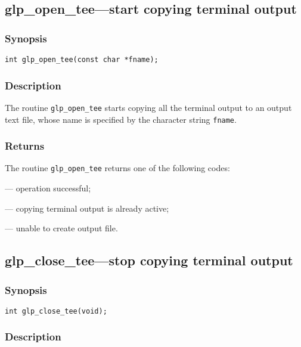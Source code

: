\subsection{glp\_open\_tee---start copying terminal output}

\subsubsection*{Synopsis}

\begin{verbatim}
int glp_open_tee(const char *fname);
\end{verbatim}

\subsubsection*{Description}

The routine \verb|glp_open_tee| starts copying all the terminal output
to an output text file, whose name is specified by the character string
\verb|fname|.

\subsubsection*{Returns}

The routine \verb|glp_open_tee| returns one of the following codes:

 --- operation successful;

 --- copying terminal output is already active;

 --- unable to create output file.

\subsection{glp\_close\_tee---stop copying terminal output}

\subsubsection*{Synopsis}

\begin{verbatim}
int glp_close_tee(void);
\end{verbatim}

\subsubsection*{Description}

